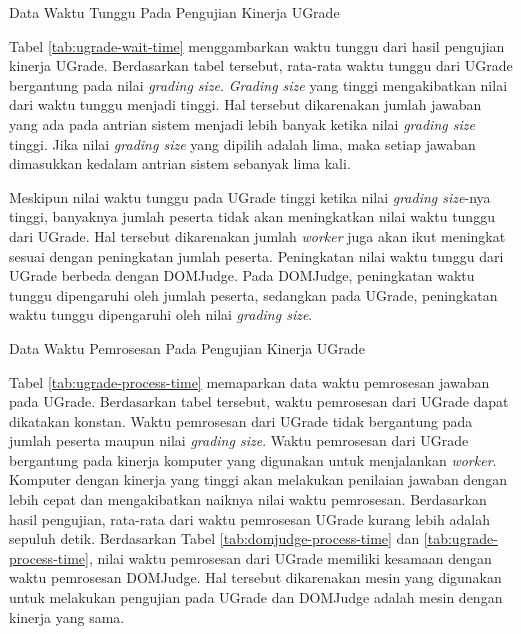 \begin{table}[ht!]
    \centering
    
    \caption{Data Waktu Tunggu Pada Pengujian Kinerja UGrade}
    \label{tab:ugrade-wait-time}
\end{table}

\par Tabel \ref{tab:ugrade-wait-time} menggambarkan waktu tunggu dari hasil pengujian kinerja UGrade. Berdasarkan tabel tersebut, rata-rata waktu tunggu dari UGrade bergantung pada nilai \textit{grading size}. \textit{Grading size} yang tinggi mengakibatkan nilai dari waktu tunggu menjadi tinggi. Hal tersebut dikarenakan jumlah jawaban yang ada pada antrian sistem menjadi lebih banyak ketika nilai \textit{grading size} tinggi. Jika nilai \textit{grading size} yang dipilih adalah lima, maka setiap jawaban dimasukkan kedalam antrian sistem sebanyak lima kali.

\par Meskipun nilai waktu tunggu pada UGrade tinggi ketika nilai \textit{grading size}-nya tinggi, banyaknya jumlah peserta tidak akan meningkatkan nilai waktu tunggu dari UGrade. Hal tersebut dikarenakan jumlah \textit{worker} juga akan ikut meningkat sesuai dengan peningkatan jumlah peserta. Peningkatan nilai waktu tunggu dari UGrade berbeda dengan DOMJudge. Pada DOMJudge, peningkatan waktu tunggu dipengaruhi oleh jumlah peserta, sedangkan pada UGrade, peningkatan waktu tunggu dipengaruhi oleh nilai \textit{grading size}.

\begin{table}[ht!]
    \centering
    
    \caption{Data Waktu Pemrosesan Pada Pengujian Kinerja UGrade}
    \label{tab:ugrade-process-time}
\end{table}

\par Tabel \ref{tab:ugrade-process-time} memaparkan data waktu pemrosesan jawaban pada UGrade. Berdasarkan tabel tersebut, waktu pemrosesan dari UGrade dapat dikatakan konstan. Waktu pemrosesan dari UGrade tidak bergantung pada jumlah peserta maupun nilai \textit{grading size}. Waktu pemrosesan dari UGrade bergantung pada kinerja komputer yang digunakan untuk menjalankan \textit{worker}. Komputer dengan kinerja yang tinggi akan melakukan penilaian jawaban dengan lebih cepat dan mengakibatkan naiknya nilai waktu pemrosesan. Berdasarkan hasil pengujian, rata-rata dari waktu pemrosesan UGrade kurang lebih adalah sepuluh detik. Berdasarkan Tabel \ref{tab:domjudge-process-time} dan \ref{tab:ugrade-process-time}, nilai waktu pemrosesan dari UGrade memiliki kesamaan dengan waktu pemrosesan DOMJudge. Hal tersebut dikarenakan mesin yang digunakan untuk melakukan pengujian pada UGrade dan DOMJudge adalah mesin dengan kinerja yang sama.

